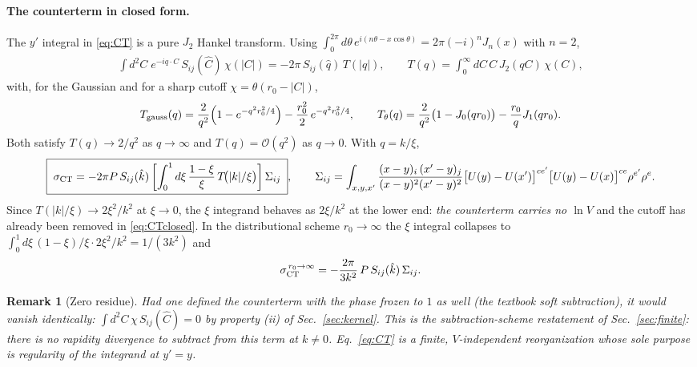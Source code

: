 \documentclass[11pt]{article}
\newtheorem{remark}{Remark}
\newcommand{\bC}{C}
\newcommand{\Chat}{\hat C}
\newcommand{\khat}{\hat k}
\begin{document}
\paragraph{The counterterm in closed form.}  The $y'$ integral in
\eqref{eq:CT} is a pure $J_2$ Hankel transform.  Using
$\int_0^{2\pi}d\theta\,e^{i(n\theta-x\cos\theta)}=2\pi(-i)^nJ_n(x)$ with
$n=2$,
\begin{align}
\int d^2\bC\;e^{-iq\cdot\bC}\,S_{ij}(\Chat)\,\chi(|\bC|)
=-2\pi\,S_{ij}(\hat q)\,T(|q|),
\qquad
T(q)=\int_0^\infty d\bC\,\bC\,J_2(q\bC)\,\chi(\bC),
\label{eq:FT}
\end{align}
with, for the Gaussian and for a sharp cutoff $\chi=\theta(r_0-|\bC|)$,
\begin{align}
T_{\rm gauss}(q)=\frac{2}{q^{2}}\Big(1-e^{-q^{2}r_0^{2}/4}\Big)
-\frac{r_0^{2}}{2}\,e^{-q^{2}r_0^{2}/4},
\qquad
T_{\theta}(q)=\frac{2}{q^{2}}\big(1-J_0(qr_0)\big)
-\frac{r_0}{q}J_1(qr_0).
\label{eq:T}
\end{align}
Both satisfy $T(q)\to2/q^{2}$ as $q\to\infty$ and $T(q)=\mathcal O(q^2)$
as $q\to0$.  With $q=k/\xi$,
\begin{align}
\boxed{\;
\sigma_{\rm CT}
=-2\pi P\,S_{ij}(\khat)
\left[\int_{0}^{1}d\xi\,\frac{1-\xi}{\xi}\,T\!\big(|k|/\xi\big)\right]
\Sigma_{ij}\;},
\qquad
\Sigma_{ij}=\int_{x,y,x'}
\frac{(x-y)_i\,(x'-y)_j}{(x-y)^{2}(x'-y)^{2}}
\big[U(y)-U(x')\big]^{ce'}\big[U(y)-U(x)\big]^{ce}\rho^{e'}\rho^{e}.
\label{eq:CTclosed}
\end{align}
Since $T(|k|/\xi)\to2\xi^{2}/k^{2}$ at $\xi\to0$, the $\xi$ integrand
behaves as $2\xi/k^{2}$ at the lower end: \emph{the counterterm carries
no $\ln V$} and the cutoff has already been removed in
\eqref{eq:CTclosed}.  In the distributional scheme $r_0\to\infty$ the
$\xi$ integral collapses to
$\int_0^1d\xi\,(1-\xi)/\xi\cdot2\xi^2/k^2=1/(3k^{2})$ and
\begin{align}
\sigma_{\rm CT}^{\,r_0\to\infty}
=-\frac{2\pi}{3k^{2}}\,P\,S_{ij}(\khat)\,\Sigma_{ij}.
\end{align}

\begin{remark}[Zero residue]
Had one defined the counterterm with the phase frozen to $1$ as well
(the textbook soft subtraction), it would vanish identically:
$\int d^2\bC\,\chi\,S_{ij}(\Chat)=0$ by property (ii) of
Sec.~\ref{sec:kernel}.  This is the subtraction-scheme restatement of
Sec.~\ref{sec:finite}: there is no rapidity divergence to subtract from
this term at $k\ne0$.  Eq.~\eqref{eq:CT} is a finite, $V$-independent
reorganization whose sole purpose is regularity of the integrand at
$y'=y$.
\end{remark}
\end{document}
